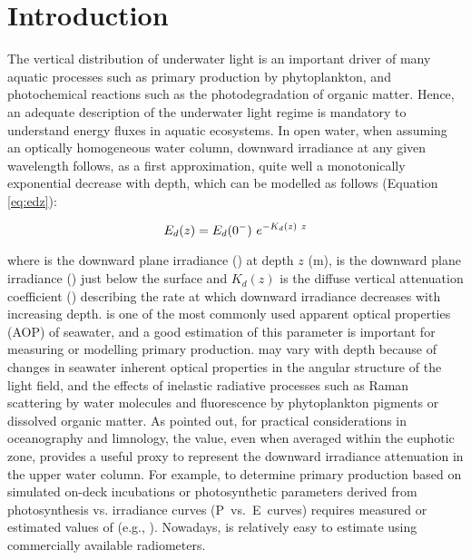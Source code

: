 \section{Introduction}

The vertical distribution of underwater light is an important driver of many aquatic processes such as primary production by phytoplankton, and photochemical reactions such as the photodegradation of organic matter. Hence, an adequate description of the underwater light regime is mandatory to understand energy fluxes in aquatic ecosystems. In open water, when assuming an optically homogeneous water column, downward irradiance at any given wavelength follows, as a first approximation, quite well a monotonically exponential decrease with depth, which can be modelled as follows \citep{Kirk1994} (Equation \ref{eq:edz}):

\begin{equation}
    {E_d(z)}{} = {E_d(0^-)}{}~e^{-K_{d}(z)~z}
    \label{eq:edz}
\end{equation}

\noindent where \edz{} is the downward plane irradiance (\wmsquare{}) at depth $z$ (m), \edzero{} is the downward plane irradiance (\wmsquare{}) just below the surface and $K_d(z)$ is the diffuse vertical attenuation coefficient (\mminus{}) describing the rate at which downward irradiance decreases with increasing depth. \ked{} is one of the most commonly used apparent optical properties (AOP) of seawater, and a good estimation of this parameter is important for measuring or modelling primary production. \ked{} may vary with depth because of changes in seawater inherent optical properties in the angular structure of the light field, and the effects of inelastic radiative processes such as Raman scattering by water molecules and fluorescence by phytoplankton pigments or dissolved organic matter. As \citet{Kirk1994} pointed out, for practical considerations in oceanography and limnology, the \ked{} value, even when averaged within the euphotic zone, provides a useful proxy to represent the downward irradiance attenuation in the upper water column. For example, to determine primary production based on simulated on-deck incubations or photosynthetic parameters derived from photosynthesis vs. irradiance curves (P~vs.~E~curves) requires measured or estimated values of \ked{} (e.g., \citet{Morel1996}). Nowadays, \ked{} is relatively easy to estimate using commercially available radiometers.

